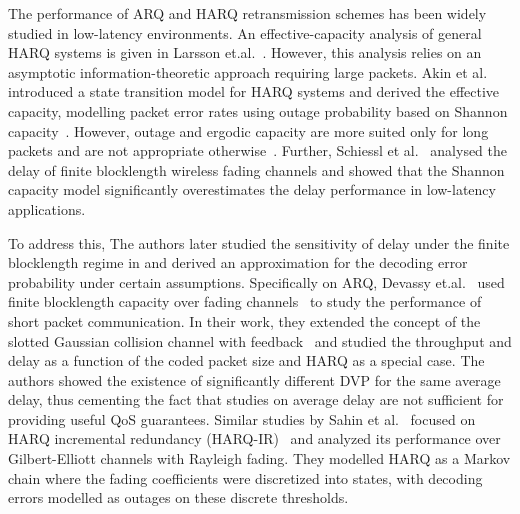 The performance of ARQ and HARQ retransmission schemes has been widely studied in low-latency environments. 
An effective-capacity\cite{wu2003effectiveCap} analysis of general HARQ systems is given in Larsson et.al.~\cite{larsson2016HARQ}. However, this analysis relies on an asymptotic information-theoretic approach requiring large packets\cite{devassy2019reliable}.
Akin et al.~\cite{akin2015backlog} introduced a state transition model for HARQ systems and derived the effective capacity, modelling packet error rates using outage probability based on Shannon capacity~\cite{Shannon}. However, outage and ergodic capacity are more suited only for long packets and are not appropriate otherwise~\cite{durisi2016URLLC}. 
Further, Schiessl et al.~\cite{schiessl2015delay} analysed the delay of finite blocklength wireless fading channels and showed that the Shannon capacity model significantly overestimates the delay performance in low-latency applications. 


To address this, The authors later studied the sensitivity of delay under the finite blocklength regime in \cite{schiessl2018delay} and derived an approximation for the decoding error probability under certain assumptions. 
Specifically on ARQ, Devassy et.al.~\cite{devassy2014finite,devassy2018delay,devassy2019reliable} used finite blocklength capacity over fading channels~\cite{polyanskiy2010FBL,polyanskiy2011feedback,Wei2013FBLblockfading} to study the performance of short packet communication.
In their work, they extended the concept of the slotted Gaussian collision channel with feedback~\cite{caire2000modulation,caire2001throughput} and studied the throughput and delay as a function of the coded packet size and HARQ as a special case. The authors showed the existence of significantly different DVP for the same average delay, thus cementing the fact that studies on average delay are not sufficient for providing useful QoS guarantees. Similar studies by Sahin et al.~\cite{Sahin2014Harq,Sahin2015Harq,Sahin2019Harq} focused on HARQ incremental redundancy (HARQ-IR)~\cite{DAHLMAN2014299} and analyzed its performance over Gilbert-Elliott channels with Rayleigh fading. They modelled HARQ as a Markov chain where the fading coefficients were discretized into states, with decoding errors modelled as outages on these discrete thresholds.


